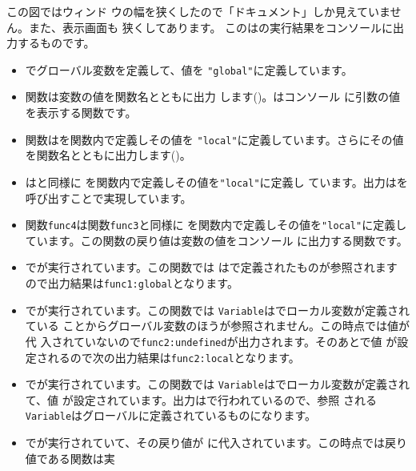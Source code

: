 この図ではウィンド
ウの幅を狭くしたので「ドキュメント」しか見えていません。また、表示画面も
狭くしてあります。
{}
この\HTML は\JS の実行結果をコンソールに出力するものです。
\begin{itemize}
 \item {}でグローバル変数を定義して、値を
       \texttt{"global"}に定義しています。
 \item 関数は変数の値を関数名とともに出力
       します()。はコンソール
       に引数の値を表示する関数です。
 \item 関数はを関数内で定義しその値を
       \texttt{"local"}に定義しています。さらにその値 
       を関数名とともに出力します()。
 \item {}はと同様に
       を関数内で定義しその値を\texttt{"local"}に定義し
       ています。出力はを呼び出すことで実現しています。
 \item 関数\texttt{func4}は関数\texttt{func3}と同様に
       を関数内で定義しその値を\texttt{"local"}に定義し
       ています。この関数の戻り値は変数の値をコンソール
       に出力する関数です。
 \item {}でが実行されています。この関数では
       はで定義されたものが参照されます
       ので出力結果は\texttt{func1:global}となります。
 \item {}でが実行されています。この関数では
       \texttt{Variable}はでローカル変数が定義されている
       ことからグローバル変数のほうが参照されません。この時点では値が代
       入されていないので\texttt{func2:undefined}が出力されます。そのあとで値
       が設定されるので次の出力結果は\texttt{func2:local}となります。
 \item {}でが実行されています。この関数では
       \texttt{Variable}はでローカル変数が定義されて、値
       が設定されています。出力はで行われているので、参照
       される\texttt{Variable}はグローバルに定義されているものになります。
 \item {}でが実行されていて、その戻り値が
       に代入されています。この時点では戻り値である関数は実

\end{itemize}
